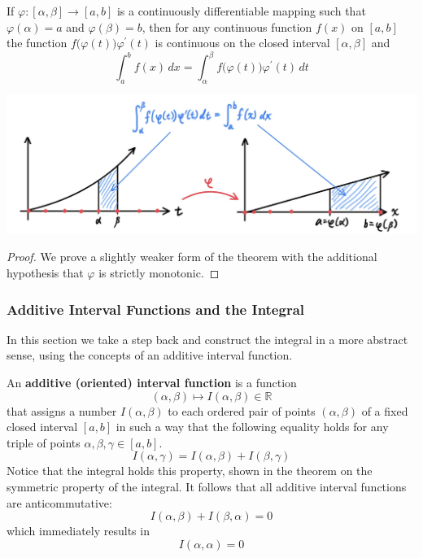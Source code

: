 \documentclass{article}
\begin{document}
      \begin{theorem}
      If $\varphi: [\alpha, \beta] \longrightarrow [a, b]$ is a continuously differentiable mapping such that $\varphi(\alpha) = a$ and $\varphi(\beta) = b$, then for any continuous function $f(x)$ on $[a, b]$ the function $f\big(\varphi(t)\big) \varphi^\prime (t)$ is continuous on the closed interval $[\alpha, \beta]$ and 
      \[\int_a^b f(x)\,dx = \int_\alpha^\beta f\big(\varphi(t)\big) \varphi^\prime(t)\,dt\]
      \begin{center}
          \includegraphics[scale=0.25]{img/Change_of_Variable_Analysis_Integral.jpg}
      \end{center}
      \end{theorem}
      \begin{proof}
      We prove a slightly weaker form of the theorem with the additional hypothesis that $\varphi$ is strictly monotonic. 
      \end{proof}

      \subsubsection{Additive Interval Functions and the Integral}
      In this section we take a step back and construct the integral in a more abstract sense, using the concepts of an additive interval function. 

      \begin{definition}
        An \textbf{additive (oriented) interval function} is a function 
        \[(\alpha, \beta) \mapsto I(\alpha, \beta) \in \mathbb{R}\]
        that assigns a number $I(\alpha, \beta)$ to each ordered pair of points $(\alpha, \beta)$ of a fixed closed interval $[a, b]$ in such a way that the following equality holds for any triple of points $\alpha, \beta, \gamma \in [a, b]$. 
        \[I(\alpha, \gamma) = I(\alpha, \beta) + I(\beta, \gamma)\]
        Notice that the integral holds this property, shown in the theorem on the symmetric property of the integral. It follows that all additive interval functions are anticommutative: 
        \[I(\alpha, \beta) + I(\beta, \alpha) = 0\]
        which immediately results in
        \[I(\alpha, \alpha) = 0\]
      \end{definition}
\end{document}
